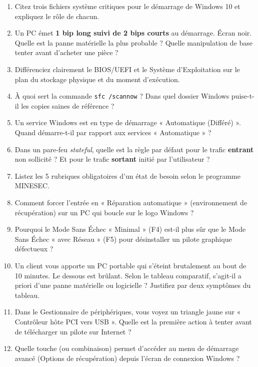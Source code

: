 \documentclass[11pt]{article}
\begin{document}
\begin{exercice}
\begin{enumerate}
    \item Citez trois fichiers système critiques pour le démarrage de Windows 10 et expliquez le rôle de chacun.
    \item Un PC émet \textbf{1 bip long suivi de 2 bips courts} au démarrage. Écran noir. Quelle est la panne matérielle la plus probable ? Quelle manipulation de base tenter avant d'acheter une pièce ?
    \item Différenciez clairement le BIOS/UEFI et le Système d'Exploitation sur le plan du stockage physique et du moment d'exécution.
    \item À quoi sert la commande \texttt{sfc /scannow} ? Dans quel dossier Windows puise-t-il les copies saines de référence ?
    \item Un service Windows est en type de démarrage « Automatique (Différé) ». Quand démarre-t-il par rapport aux services « Automatique » ?
    \item Dans un pare-feu \emph{stateful}, quelle est la règle par défaut pour le trafic \textbf{entrant} non sollicité ? Et pour le trafic \textbf{sortant} initié par l'utilisateur ?
    \item Listez les 5 rubriques obligatoires d'un état de besoin selon le programme MINESEC.
    \item Comment forcer l'entrée en « Réparation automatique » (environnement de récupération) sur un PC qui boucle sur le logo Windows ?
    \item Pourquoi le Mode Sans Échec « Minimal » (F4) est-il plus sûr que le Mode Sans Échec « avec Réseau » (F5) pour désinstaller un pilote graphique défectueux ?
    \item Un client vous apporte un PC portable qui s'éteint brutalement au bout de 10 minutes. Le dessous est brûlant. Selon le tableau comparatif, s'agit-il a priori d'une panne matérielle ou logicielle ? Justifiez par deux symptômes du tableau.
    \item Dans le Gestionnaire de périphériques, vous voyez un triangle jaune sur « Contrôleur hôte PCI vers USB ». Quelle est la première action à tenter avant de télécharger un pilote sur Internet ?
    \item Quelle touche (ou combinaison) permet d'accéder au menu de démarrage avancé (Options de récupération) depuis l'écran de connexion Windows ?
\end{enumerate}
\end{exercice}
\end{document}
